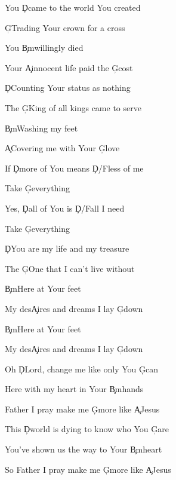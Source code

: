 \documentclass[9pt]{extarticle}
\begin{document}
\bsong

\bi

\ei

\bv
You \c{D}came to the world You created

\c{G}Trading Your crown for a cross

You \c{Bm}willingly died

Your \c{A}innocent life paid the \c{G}cost
\ev

\bv
\c{D}Counting Your status as nothing

The \c{G}King of all kings came to serve

\c{Bm}Washing my feet

\c{A}Covering me with Your \c{G}love
\ev

\bc
If \c{D}more of You means \c{D/F\s }less of me

Take \c{G}everything

Yes, \c{D}all of You is \c{D/F\s }all I need

Take \c{G}everything
\ec

\bv
\c{D}You are my life and my treasure

The \c{G}One that I can't live without

\c{Bm}Here at Your feet

My des\c{A}ires and dreams I lay \c{G}down

\c{Bm}Here at Your feet

My des\c{A}ires and dreams I lay \c{G}down
\ev


\bb[2]
Oh \c{D}Lord, change me like only You \c{G}can

Here with my heart in Your \c{Bm}hands

Father I pray make me \c{G}more like \c{A}Jesus

This \c{D}world is dying to know who You \c{G}are

You've shown us the way to Your \c{Bm}heart

So Father I pray make me \c{G}more like \c{A}Jesus
\eb


\esong
\end{document}

